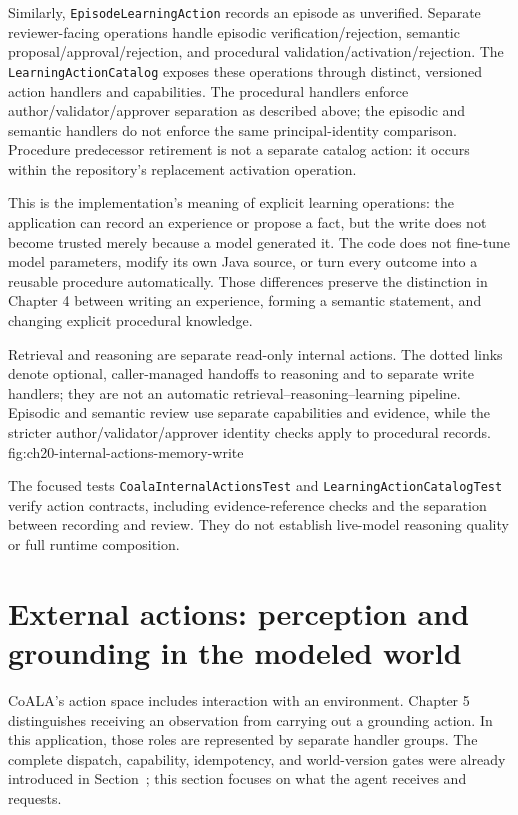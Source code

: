 Similarly, \texttt{EpisodeLearningAction} records an episode as unverified. Separate reviewer-facing operations handle episodic verification/rejection, semantic proposal/approval/rejection, and procedural validation/activation/rejection. The \texttt{LearningActionCatalog} exposes these operations through distinct, versioned action handlers and capabilities. The procedural handlers enforce author/validator/approver separation as described above; the episodic and semantic handlers do not enforce the same principal-identity comparison. Procedure predecessor retirement is not a separate catalog action: it occurs within the repository's replacement activation operation.

This is the implementation's meaning of explicit learning operations: the application can record an experience or propose a fact, but the write does not become trusted merely because a model generated it. The code does not fine-tune model parameters, modify its own Java source, or turn every outcome into a reusable procedure automatically. Those differences preserve the distinction in Chapter 4 between writing an experience, forming a semantic statement, and changing explicit procedural knowledge.

  {Retrieval and reasoning are separate read-only internal actions. The dotted links denote optional, caller-managed handoffs to reasoning and to separate write handlers; they are not an automatic retrieval--reasoning--learning pipeline. Episodic and semantic review use separate capabilities and evidence, while the stricter author/validator/approver identity checks apply to procedural records.}
  {fig:ch20-internal-actions-memory-write}

The focused tests \texttt{CoalaInternal\allowbreak ActionsTest} and \texttt{LearningAction\allowbreak CatalogTest} verify action contracts, including evidence-reference checks and the separation between recording and review. They do not establish live-model reasoning quality or full runtime composition.

\section{External actions: perception and grounding in the modeled world}
\label{sec:ch20-external-actions}

CoALA's action space includes interaction with an environment. Chapter 5 distinguishes receiving an observation from carrying out a grounding action. In this application, those roles are represented by separate handler groups. The complete dispatch, capability, idempotency, and world-version gates were already introduced in Section~\ChapterNineteenActionBoundaryRef; this section focuses on what the agent receives and requests.


